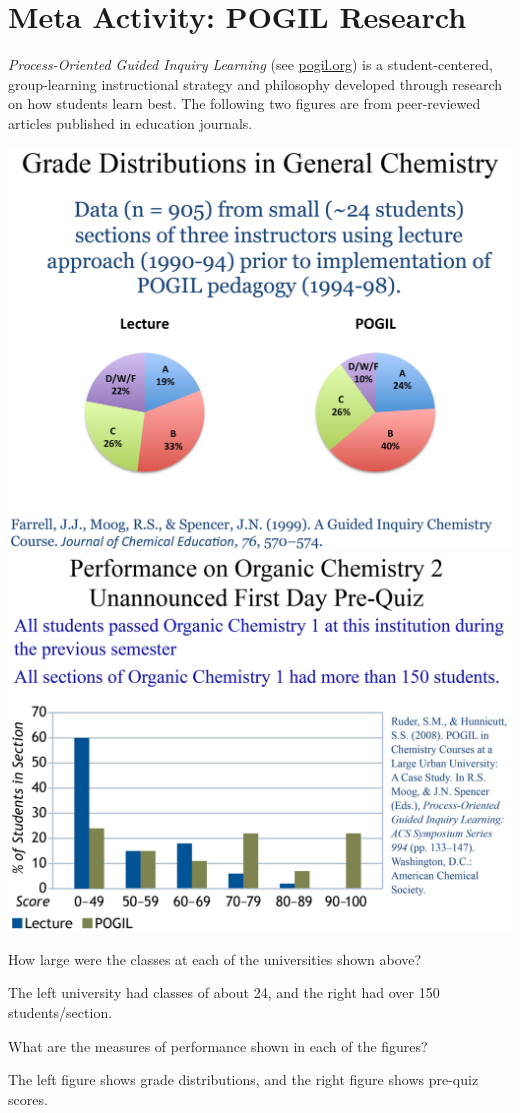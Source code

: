 \section*{Meta Activity: POGIL Research}

\textit{Process-Oriented Guided Inquiry Learning} (see \href{https://pogil.org/}{pogil.org}) is a student-centered, group-learning instructional strategy and philosophy developed through research on how students learn best.
The following two figures are from peer-reviewed articles published in education journals.


\vspace{1em}
\includegraphics[width=0.47\linewidth]{pogil-grades.png}
\hfill
\includegraphics[width=0.50\linewidth]{pogil-prequiz.png}




\Q How large were the classes at each of the universities shown above?

\begin{answer}[2em]
The left university had classes of about 24, and the right had over 150 students/section.
\end{answer}


\Q What are the measures of performance shown in each of the figures?

\begin{answer}[2em]
The left figure shows grade distributions, and the right figure shows pre-quiz scores.
\end{answer}


